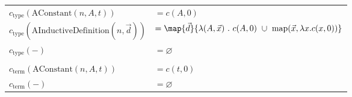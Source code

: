 \vspace{1em}
\begin{tabular}{ll}
  $c_{\text{type}}(\text{AConstant}(n, A, t))$ & $= c(A, 0)$ \\
  $c_{\text{type}}(\text{AInductiveDefinition}(n, \vec{d}))$ & $= \map{\vec{d}}{ \lambda (A, \vec{x}) ~.~ c(A, 0) ~\cup~ \text{map}(\vec{x}, \lambda x . c(x, 0)) } $\\
  $c_{\text{type}}(-)$ & $= \varnothing$ \\
  & \\
  $c_{\text{term}}(\text{AConstant}(n, A, t))$ & $= c(t, 0)$ \\
  $c_{\text{term}}(-)$ & $= \varnothing$ \\
\end{tabular}

